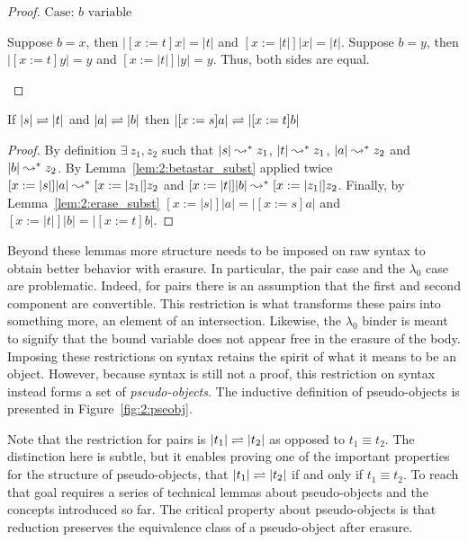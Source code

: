 \begin{proof}
    $\text{Case: }b \text{ variable}$
    \begin{proofcase}
        Suppose $b = x$, then $|[x := t]x| = |t|$ and $[x := |t|]|x| = |t|$.
        Suppose $b = y$, then $|[x := t]y| = y$ and $[x := |t|]|y| = y$.
        Thus, both sides are equal.
    \end{proofcase}
\end{proof}

\begin{lemma}
    \label{lem:2:betaconv_erased_subst}
    If $|s| \rightleftharpoons |t|$ and $|a| \rightleftharpoons |b|$ then $|[x := s]a| \rightleftharpoons |[x := t]b|$
\end{lemma}
\begin{proof}
    By definition $\exists\ z_1, z_2$ such that $|s| \leadsto^* z_1$, $|t| \leadsto^* z_1$, $|a| \leadsto^* z_2$ and $|b| \leadsto^* z_2$.
    By Lemma~\ref{lem:2:betastar_subst} applied twice $[x := |s|]|a| \leadsto^* [x := |z_1|]z_2$ and $[x := |t|]|b| \leadsto^* [x := |z_1|]z_2$.
    Finally, by Lemma~\ref{lem:2:erase_subst} $[x := |s|]|a| = |[x := s]a|$ and $[x := |t|]|b| = |[x := t]b|$.
\end{proof}

Beyond these lemmas more structure needs to be imposed on raw syntax to obtain better behavior with erasure.
In particular, the pair case and the $\lambda_0$ case are problematic.
Indeed, for pairs there is an assumption that the first and second component are convertible.
This restriction is what transforms these pairs into something more, an element of an intersection.
Likewise, the $\lambda_0$ binder is meant to signify that the bound variable does not appear free in the erasure of the body.
Imposing these restrictions on syntax retains the spirit of what it means to be an object.
However, because syntax is still not a proof, this restriction on syntax instead forms a set of \textit{pseudo-objects}.
The inductive definition of pseudo-objects is presented in Figure~\ref{fig:2:pseobj}.



Note that the restriction for pairs is $|t_1| \rightleftharpoons |t_2|$ as opposed to $t_1 \equiv t_2$.
The distinction here is subtle, but it enables proving one of the important properties for the structure of pseudo-objects, that $|t_1| \rightleftharpoons |t_2|$ if and only if $t_1 \equiv t_2$.
To reach that goal requires a series of technical lemmas about pseudo-objects and the concepts introduced so far.
The critical property about pseudo-objects is that reduction preserves the equivalence class of a pseudo-object after erasure.

